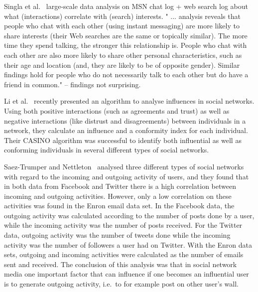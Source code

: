 \documentclass[letterpaper]{article}
\begin{document}
Singla et al.~\cite{singla2008yes} large-scale data analysis on MSN chat log + web search log about what (interactions) correlate with (search) interests.   " ... analysis reveals that people who chat with each other (using instant messaging) are more likely to share interests (their Web searches are the same or topically similar). The more time they spend talking, the stronger this relationship is. People who chat with each other are also more likely to share other personal characteristics, such as their age and location (and, they are likely to be of opposite gender). Similar findings hold for people who do not necessarily talk to each other but do have a friend in common." -- findings not surprising.


Li et al.~\cite{li2011casino} recently presented an algorithm to analyse influences in social networks. Using both positive interactions (such as agreements and trust) as well as negative interactions (like distrust and disagreements) between individuals in a network, they calculate an influence and a conformity index for each individual. Their CASINO algorithm was successful to identify both influential as well as conforming individuals in several different types of social networks.




Saez-Trumper and Nettleton~\cite{saez2011high} analysed three different types of social networks with regard to the incoming and outgoing activity of users, and they found that in both data from Facebook and Twitter there is a high correlation between incoming and outgoing activities. However, only a low correlation on these activities was found in the Enron email data set. In the Facebook data, the outgoing activity was calculated according to the number of posts done by a user, while the incoming activity was the number of posts received. For the Twitter data, outgoing activity was the number of tweets done while the incoming activity was the number of followers a user had on Twitter. With the Enron data sets, outgoing and incoming activities were calculated as the number of emails sent and received. The conclusion of this analysis was that in social network media one important factor that can influence if one becomes an influential user is to generate outgoing activity, i.e.\ to for example post on other user's wall.
\end{document}
